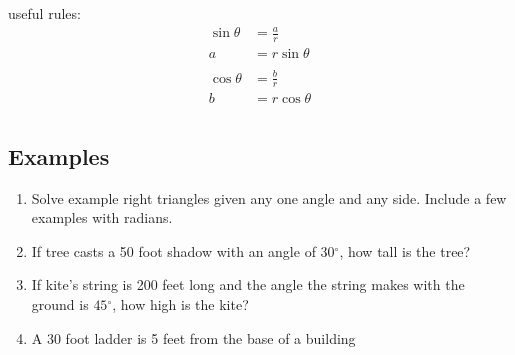 \documentclass{exam}
\newcommand{\dg}{\ensuremath{^\circ}}
\begin{document}
  useful rules:
  \begin{align*}
    \sin \theta & = \frac{a}{r} \\
    a           & = r \sin \theta \\
    \\
    \cos \theta & = \frac{b}{r} \\
    b           & = r \cos \theta \\
  \end{align*}

  \subsection{Examples}

  \begin{enumerate}
    \item Solve example right triangles given any one angle and any side.  Include a few examples with radians.

    \item If tree casts a 50 foot shadow with an angle of $30 \dg$, how tall is the tree?

    \item If kite's string is 200 feet long and the angle the string makes with the ground is $45 \dg$, how high is the
      kite?

    \item A 30 foot ladder is 5 feet from the base of a building

  \end{enumerate}
\end{document}
